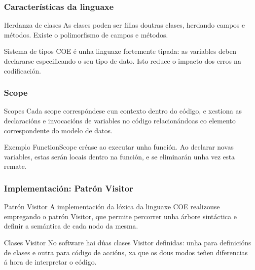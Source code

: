 \documentclass[12pt]{beamer}
\begin{document}
\begin{frame}
\frametitle{Características da linguaxe}
\begin{block}{Herdanza de clases}
As clases poden ser fillas doutras clases, herdando campos e métodos. Existe o
polimorfismo de campos e métodos.
\end{block}

\begin{block}{Sistema de tipos}
COE é unha linguaxe fortemente tipada: as variables deben declararse
especificando o seu tipo de dato. Isto reduce o impacto dos erros na
codificación.
\end{block}
\end{frame}

\begin{frame}
\frametitle{Scope}
\begin{block}{Scopes}
Cada scope correspóndese cun contexto dentro do código, e xestiona as
declaracións e invocacións de variables no código relacionándoas co elemento
correspondente do modelo de datos.
\end{block}
\begin{exampleblock}{Exemplo}
FunctionScope créase ao executar unha función. Ao declarar novas variables,
estas serán locais dentro na función, e se eliminarán unha vez esta remate.
\end{exampleblock}
\end{frame}

\begin{frame}
\frametitle{Implementación: Patrón Visitor}
\begin{block}{Patrón Visitor}
A implementación da lóxica da linguaxe COE realizouse empregando o patrón
Visitor, que permite percorrer unha árbore sintáctica e definir a semántica
de cada nodo da mesma.
\end{block}

\begin{block}{Clases Visitor}
No software hai dúas clases Visitor definidas: unha para definicións de clases e
outra para código de accións, xa que os dous modos teñen diferencias á hora de
interpretar o código.
\end{block}
\end{frame}

\end{document}
